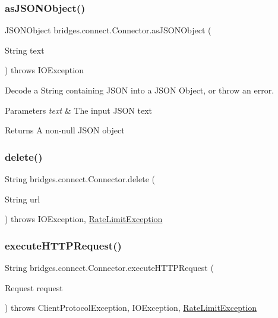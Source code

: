 \subsubsection{\texorpdfstring{as\+J\+S\+O\+N\+Object()}{asJSONObject()}}
{\footnotesize\ttfamily J\+S\+O\+N\+Object bridges.\+connect.\+Connector.\+as\+J\+S\+O\+N\+Object (\begin{DoxyParamCaption}\item[{String}]{text }\end{DoxyParamCaption}) throws I\+O\+Exception}

Decode a String containing J\+S\+ON into a J\+S\+ON Object, or throw an error. 
\begin{DoxyParams}{Parameters}
{\em text} & The input J\+S\+ON text \\
\hline
\end{DoxyParams}
\begin{DoxyReturn}{Returns}
A non-\/null J\+S\+ON object 
\end{DoxyReturn}
\mbox{\label{classbridges_1_1connect_1_1_connector_ac0a6f796f1ebcf312b89a7d233c8ac91}} 
\subsubsection{\texorpdfstring{delete()}{delete()}}
{\footnotesize\ttfamily String bridges.\+connect.\+Connector.\+delete (\begin{DoxyParamCaption}\item[{String}]{url }\end{DoxyParamCaption}) throws I\+O\+Exception, \mbox{\hyperlink{classbridges_1_1validation_1_1_rate_limit_exception}{Rate\+Limit\+Exception}}}

\mbox{\label{classbridges_1_1connect_1_1_connector_aabcfde23d155c8c42edb8a1407320bc5}} 
\subsubsection{\texorpdfstring{execute\+H\+T\+T\+P\+Request()}{executeHTTPRequest()}}
{\footnotesize\ttfamily String bridges.\+connect.\+Connector.\+execute\+H\+T\+T\+P\+Request (\begin{DoxyParamCaption}\item[{Request}]{request }\end{DoxyParamCaption}) throws Client\+Protocol\+Exception, I\+O\+Exception, \mbox{\hyperlink{classbridges_1_1validation_1_1_rate_limit_exception}{Rate\+Limit\+Exception}}}

